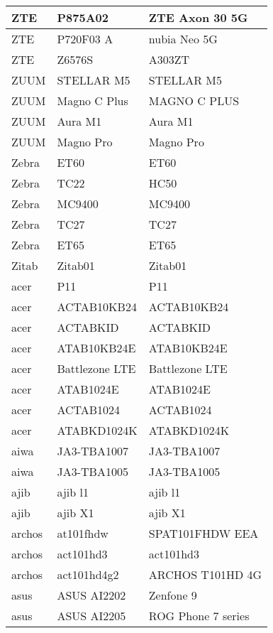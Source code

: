 \begin{tabularx}{\linewidth}{|l|X|X|}
        ZTE & P875A02 & ZTE Axon 30 5G \\ \hline
        ZTE & P720F03 A & nubia Neo 5G \\ \hline
        ZTE & Z6576S & A303ZT \\ \hline
        ZUUM & STELLAR M5 & STELLAR M5 \\ \hline
        ZUUM & Magno C Plus & MAGNO C PLUS \\ \hline
        ZUUM & Aura M1 & Aura M1 \\ \hline
        ZUUM & Magno Pro & Magno Pro \\ \hline
        Zebra & ET60 & ET60 \\ \hline
        Zebra & TC22 & HC50 \\ \hline
        Zebra & MC9400 & MC9400 \\ \hline
        Zebra & TC27 & TC27 \\ \hline
        Zebra & ET65 & ET65 \\ \hline
        Zitab & Zitab01 & Zitab01 \\ \hline
        acer & P11 & P11 \\ \hline
        acer & ACTAB10KB24 & ACTAB10KB24 \\ \hline
        acer & ACTABKID & ACTABKID \\ \hline
        acer & ATAB10KB24E & ATAB10KB24E \\ \hline
        acer & Battlezone LTE & Battlezone LTE \\ \hline
        acer & ATAB1024E & ATAB1024E \\ \hline
        acer & ACTAB1024 & ACTAB1024 \\ \hline
        acer & ATABKD1024K & ATABKD1024K \\ \hline
        aiwa & JA3-TBA1007 & JA3-TBA1007 \\ \hline
        aiwa & JA3-TBA1005 & JA3-TBA1005 \\ \hline
        ajib & ajib l1 & ajib l1 \\ \hline
        ajib & ajib X1 & ajib X1 \\ \hline
        archos & at101fhdw & SPAT101FHDW EEA \\ \hline
        archos & act101hd3 & act101hd3 \\ \hline
        archos & act101hd4g2 & ARCHOS T101HD 4G \\ \hline
        asus & ASUS AI2202 & Zenfone 9 \\ \hline
        asus & ASUS AI2205 & ROG Phone 7 series \\ \hline

\end{tabularx}
